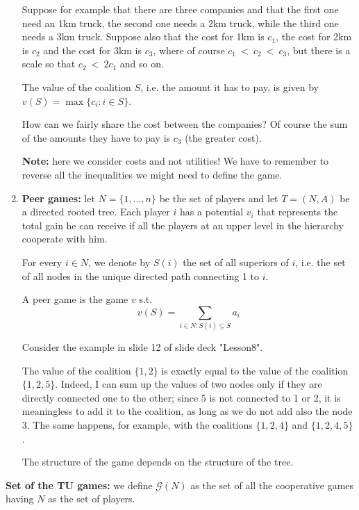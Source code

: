 \begin{enumerate}
	\noindent Suppose for example that there are three companies and that the 
	first one need an 1km truck, the second one needs a 2km truck, while the 
	third one needs a 3km truck. Suppose also that the cost for 1km is $c_1$, 
	the cost for 2km is $c_2$ and the cost for 3km is $c_3$, where of course 
	$c_1~<~c_2~<~c_3$, but there is a scale so that $c_2~<~2c_1$ and so on.
	
	\noindent The value of the coalition $S$, i.e. the amount it has to pay, is given by $v(S) = \max\{c_i: i \in S\}$.
	
	\noindent How can we fairly share the cost between the companies? Of course 
	the sum of the amounts they have to pay is $c_3$ (the greater cost).
	
	\noindent \textbf{Note:} here we consider costs and not utilities! We have to 
	remember to reverse all the inequalities we might need to define the game.
	
	\item \textbf{Peer games:}	let $N = \{1,...,n\}$ be the set of players and let $T = (N,A)$ be a directed rooted tree. Each player $i$ has a potential $v_i$ that represents the total gain he can receive if all the players at an upper level in the hierarchy cooperate with him.
	
	\noindent For every $i \in N$, we denote by $S(i)$ the set of all superiors of $i$, i.e. the set of all nodes in the unique directed path connecting 1 to $i$. 
	
	\noindent A peer game is the game $v$ s.t. 
	\[
		v(S) = \sum_{i \in N: S(i) \subseteq S}{a_i}
	\]

	\noindent Consider the example in slide 12 of slide deck "Lesson8".
	
	\noindent The value of the coalition $\{1,2\}$ is exactly equal to the value 
	of the coalition $\{1,2,5\}$. Indeed, I can sum up the values of two nodes 
	only if they are directly connected one to the other; since 5 is not 
	connected to 1 or 2, it is meaningless to add it to the coalition, as long 
	as we do not add also the node 3. The same happens, for example, with the 
	coalitions $\{1,2,4\}$ and $\{1,2,4,5\}$.
	
	\noindent The structure of the game depends on the structure of the tree.
	
\end{enumerate}	

\bigskip
\noindent \textbf{Set of the TU games:} we define $\mathcal{G}(N)$ as the set of all the cooperative games having $N$ as the set of players.

